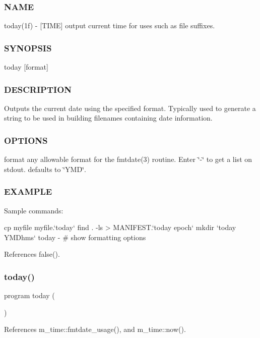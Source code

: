 \subsubsection*{N\+A\+ME}

today(1f) -\/ \mbox{[}T\+I\+ME\mbox{]} output current time for uses such as file suffixes. \subsubsection*{S\+Y\+N\+O\+P\+S\+IS}

today \mbox{[}format\mbox{]} \subsubsection*{D\+E\+S\+C\+R\+I\+P\+T\+I\+ON}

Outputs the current date using the specified format. Typically used to generate a string to be used in building filenames containing date information. \subsubsection*{O\+P\+T\+I\+O\+NS}

format any allowable format for the fmtdate(3) routine. Enter \char`\"{}-\/\char`\"{} to get a list on stdout. defaults to \char`\"{}\+Y\+M\+D\char`\"{}. \subsubsection*{E\+X\+A\+M\+P\+LE}

\begin{DoxyVerb}    Sample commands:

     cp myfile myfile.`today`
     find . -ls > MANIFEST.`today epoch`
     mkdir `today YMDhms`
     today -                              # show formatting options \end{DoxyVerb}
 

References false().

\mbox{\label{today_8f90_a85de40d003821f9db87243b8b25b8d40}} 
\subsubsection{\texorpdfstring{today()}{today()}}
{\footnotesize\ttfamily program today (\begin{DoxyParamCaption}{ }\end{DoxyParamCaption})}



References m\+\_\+time\+::fmtdate\+\_\+usage(), and m\+\_\+time\+::now().

